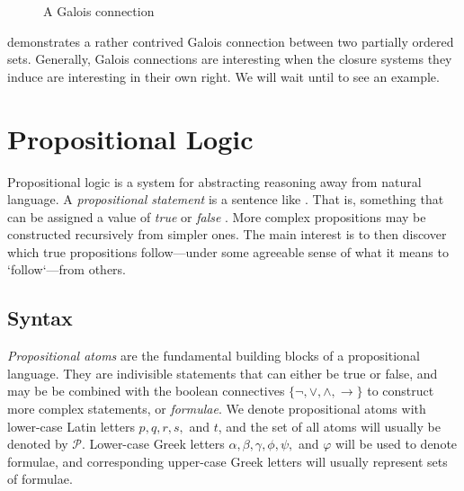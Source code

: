 \begin{figure}[H]
  \caption{A Galois connection}
  \label{figure:Galois-connection}
\end{figure}

 demonstrates a rather contrived Galois connection between two partially ordered sets. Generally, Galois connections are interesting when the closure
systems they induce are interesting in their own right. We will wait until  to see an example.

\section{Propositional Logic}
\label{section:propositional-logic}

Propositional logic is a system for abstracting reasoning away from natural language. A \textit{propositional statement} is a sentence like . That
is, something that can be assigned a value of \textit{true} or \textit{false} \cite[p. 7]{Ben1993Mathematical}. More complex propositions may be constructed recursively from simpler
ones. The main interest is to then discover which true propositions follow---under some agreeable sense of what it means to `follow`---from others.

\subsection{Syntax}
\label{subsection:syntax}     
   \textit{Propositional atoms} are the fundamental building blocks of a
propositional language. They are indivisible statements that can either be true or false, and may be be combined with the boolean connectives $\{\neg, \lor, \land, \rightarrow\}$ to
construct more complex statements, or \textit{formulae}. We denote propositional atoms with lower-case Latin letters $p,q,r,s,$ and $t$, and the set of all atoms will usually be denoted
by $\mathcal{P}$. Lower-case Greek letters $\alpha, \beta, \gamma, \phi, \psi,$ and $\varphi$ will be used to denote formulae, and corresponding upper-case Greek letters will usually
represent sets of formulae.

